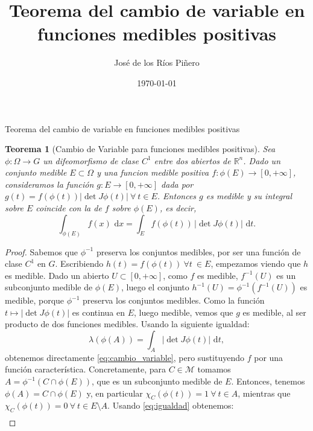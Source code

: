 \documentclass{article}
\title{Teorema del cambio de variable en funciones medibles positivas}
\author{José de los Ríos Piñero}
\date{\today}
\begin{document}
\maketitle
\tableofcontents

\newpage
\newtheorem{teorema}{Teorema}
\begin{section}{Teorema del cambio de variable en funciones medibles positivas}
\begin{teorema}[Cambio de Variable para funciones medibles positivas]
Sea $\phi: \Omega \rightarrow G$ un difeomorfismo de clase $C^1$ entre dos abiertos de $\mathbb{R}^n$. Dado un conjunto medible $E \subset \Omega$ y una funcion medible positiva $f: \phi(E) \rightarrow [0, +\infty]$, consideramos la función $g: E \rightarrow [0, +\infty]$ dada por $g(t) = f(\phi(t)) \lvert \det J\phi(t) \rvert \ \forall \ t \in E$. Entonces $g$ es medible y su integral sobre $E$ coincide con la de $f$ sobre $\phi(E)$, es decir,
\begin{equation}\label{eq:cambio_variable}
\int_{\phi(E)} f(x)\,\, \mathrm{d}x = \int_E f(\phi(t))\,\lvert\det J\phi(t)\rvert\,\, \mathrm{d}t.
\end{equation}
\end{teorema}
\begin{proof}
 Sabemos que $\phi^{-1}$ preserva los conjuntos medibles, por ser una función de clase $C^1$ en $G$. Escribiendo $h(t) = f(\phi(t)) \ \forall t \ \in E$, empezamos viendo que $h$ es medible. Dado un abierto $U \subset [0, +\infty]$, como $f$ es medible, $f^{-1}(U)$ es un subconjunto medible de $\phi(E)$, luego el conjunto $h^{-1}(U) = \phi^{-1}(f^{-1}(U))$ es medible, porque $\phi^{-1}$ preserva los conjuntos medibles. Como la función $t \mapsto \lvert \det J\phi(t) \rvert$ es continua en $E$, luego medible, vemos que $g$ es medible, al ser producto de dos funciones medibles.
 Usando la siguiente igualdad:
\begin{equation}\label{eq:igualdad}
\lambda(\phi(A)) = \int_A \lvert \det J\phi(t) \rvert\,\, \mathrm{d}t, 
\end{equation}
obtenemos directamente \eqref{eq:cambio_variable}, pero sustituyendo $f$ por una función característica. Concretamente, para $C \in \mathcal{M}$ tomamos $A = \phi^{-1}(C\cap\phi(E))$, que es un subconjunto medible de $E$. Entonces, tenemos $\phi(A) = C \cap \phi(E)$ y, en particular $\chi_C(\phi(t)) = 1 \ \forall \ t \in A$, mientras que $\chi_C(\phi(t)) = 0 \ \forall \ t \in E\setminus A$. Usando \eqref{eq:igualdad} obtenemos:
\begin{multline*}

\end{multline*}
\end{proof}
\end{section}
\end{document}
